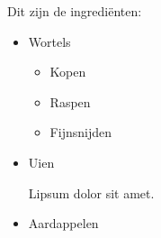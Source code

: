 \documentclass{article}
\begin{document}
Dit zijn de ingrediënten:
\begin{itemize}
    \item Wortels
    \begin{itemize}
        \item Kopen
        \item Raspen
        \item Fijnsnijden
    \end{itemize}
    \item Uien
    
    Lipsum dolor sit amet.
    \item Aardappelen
\end{itemize}
\end{document}
